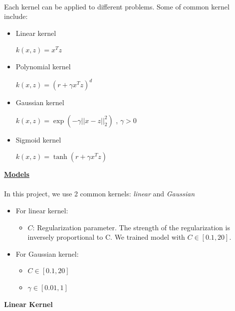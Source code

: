 \documentclass[a4paper]{report}
\begin{document}
\begin{itemize}
		\paragraph{}
		Each kernel can be applied to different problems. Some of common kernel include:
		\begin{itemize}
			\item Linear kernel
			\begin{center}
				$k(x, z) = {x^T}z$
			\end{center} 
			\item Polynomial kernel
			\begin{center}
				$k(x, z) = (r + \gamma {x^T}z)^d$
			\end{center}
			\item Gaussian kernel
			\begin{center}
				$k(x, z) = \exp(-\gamma ||x-z||^2_2)$ ,\hspace{5mm} $\gamma > 0$
			\end{center}
			\item Sigmoid kernel
			\begin{center}
				$k(x, z) = \tanh(r + \gamma {x^T}z)$
			\end{center}
		\end{itemize}
	\end{itemize}
	
	\underline{\textbf{\large Models}}
	\paragraph{}
	In this project, we use 2 common kernels: \textit{linear} and \textit{Gaussian}
	\begin{itemize}
		\item For linear kernel: 
		\begin{itemize}
			\item $C$: Regularization parameter. The strength of the regularization is inversely proportional to C. We trained model with $C \in[0.1, 20]$.
		\end{itemize}
		\item For Gaussian kernel:
		\begin{itemize}
			\item $C \in [0.1, 20]$
			\item $\gamma \in [0.01, 1]$
		\end{itemize}
	\end{itemize}
	
	\pagebreak
	
	
	\textbf{\Large Linear Kernel}
\end{document}
